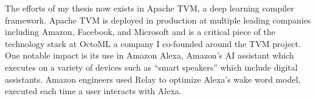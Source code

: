 \begin{fullwidth}
\begin{center}
\begin{flushleft}
The efforts of my thesis now exists in Apache TVM, a deep learning compiler framework.
Apache TVM is deployed in production at multiple leading companies including
  Amazon, Facebook, and Microsoft and is a critical piece of the technology stack
  at OctoML a company I co-founded around the TVM project.
One notable impact is its use in Amazon Alexa, Amazon's AI assistant
  which executes on a variety of devices such as ``smart speakers'' which include
  digital assistants.
Amazon engineers used Relay to optimize Alexa’s wake word model,
  executed each time a user interacts with Alexa.

\end{flushleft}
\end{center}
\end{fullwidth}
